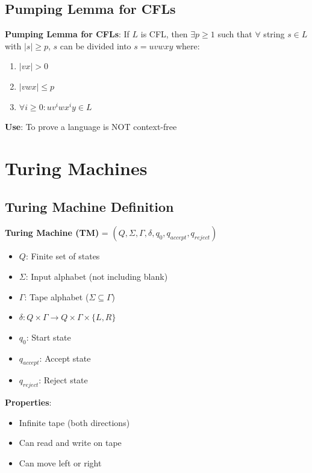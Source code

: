 \documentclass[12pt,a4paper]{report}
\begin{document}
\subsection{Pumping Lemma for CFLs}
\begin{theorem}
\textbf{Pumping Lemma for CFLs}: If $L$ is CFL, then $\exists p \geq 1$ such that $\forall$ string $s \in L$ with $|s| \geq p$, $s$ can be divided into $s = uvwxy$ where:
\begin{enumerate}
    \item $|vx| > 0$
    \item $|vwx| \leq p$
    \item $\forall i \geq 0: uv^iwx^iy \in L$
\end{enumerate}

\textbf{Use}: To prove a language is NOT context-free
\end{theorem}

\section{Turing Machines}

\subsection{Turing Machine Definition}
\begin{concept}
\textbf{Turing Machine (TM)} = $(Q, \Sigma, \Gamma, \delta, q_0, q_{accept}, q_{reject})$
\begin{itemize}
    \item $Q$: Finite set of states
    \item $\Sigma$: Input alphabet (not including blank)
    \item $\Gamma$: Tape alphabet ($\Sigma \subseteq \Gamma$)
    \item $\delta: Q \times \Gamma \to Q \times \Gamma \times \{L, R\}$
    \item $q_0$: Start state
    \item $q_{accept}$: Accept state
    \item $q_{reject}$: Reject state
\end{itemize}

\textbf{Properties}:
\begin{itemize}
    \item Infinite tape (both directions)
    \item Can read and write on tape
    \item Can move left or right
\end{itemize}
\end{concept}
\end{document}
